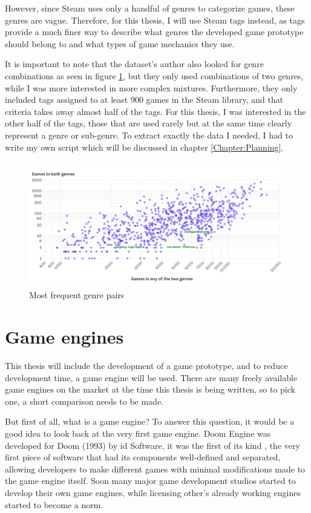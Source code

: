 However, since Steam uses only a handful of genres to categorize games, these genres are vague. Therefore, for this thesis, I will use Steam tags instead, as tags provide a much finer way to describe what genres the developed game prototype should belong to and what types of game mechanics they use.

It is important to note that the dataset's author also looked for genre combinations as seen in figure \ref{figure:genre-pairs}, but they only used combinations of two genres, while I was more interested in more complex mixtures. Furthermore, they only included tags assigned to at least 900 games in the Steam library, and that criteria takes away almost half of the tags. For this thesis, I was interested in the other half of the tags, those that are used rarely but at the same time clearly represent a genre or sub-genre. To extract exactly the data I needed, I had to write my own script which will be discussed in chapter \ref{Chapter:Planning}.

\begin{figure}[h]
    \centering
    \includegraphics[width=\textwidth]{images/genre-pairs.png}
    \caption{Most frequent genre pairs}
    \label{figure:genre-pairs}
\end{figure}



\section{Game engines}

This thesis will include the development of a game prototype, and to reduce development time, a game engine will be used. There are many freely available game engines on the market at the time this thesis is being written, so to pick one, a short comparison needs to be made.

But first of all, what is a game engine? To answer this question, it would be a good idea to look back at the very first game engine. Doom Engine was developed for Doom (1993) by id Software, it was the first of its kind \cite{gregory2018gameEngineArchitecture}, the very first piece of software that had its components well-defined and separated, allowing developers to make different games with minimal modifications made to the game engine itself. Soon many major game development studios started to develop their own game engines, while licensing other's already working engines started to become a norm.

